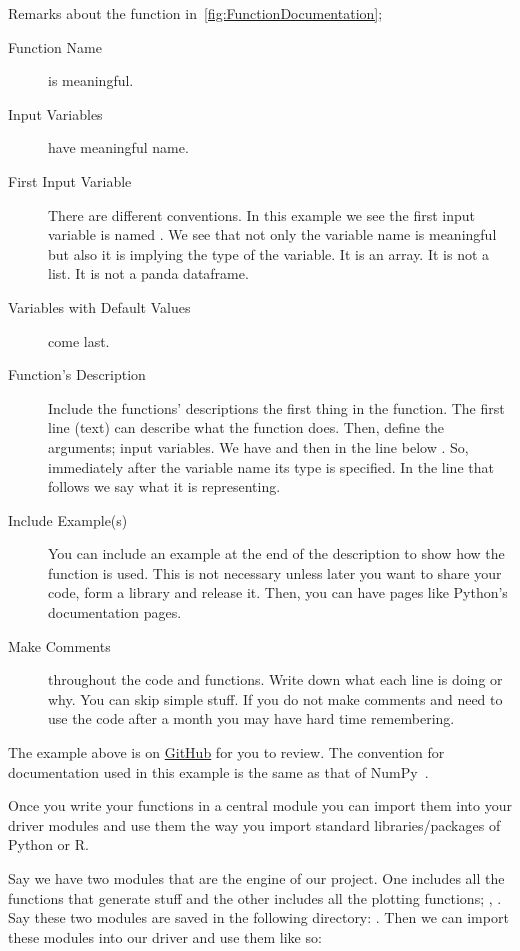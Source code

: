 \noindent Remarks about the function in~\cref{fig:FunctionDocumentation};
\begin{description}
\item [Function Name] is meaningful.
\item [Input Variables] have meaningful name. 
\item [First Input Variable] There are different conventions. In this
example we see the first input variable is named .
We see that not only the variable name is meaningful but also
it is implying the type of the variable. It is an array. It is not a list.
It is not a panda dataframe. 

\item [Variables with Default Values] come last.

\item [Function's Description] Include the functions' descriptions
the first thing in the function. The first line (text) can describe what the function does. 
Then, define the arguments; input variables. 
We have  and then in the line below .
So, immediately after the variable name its type is specified. In the line that follows we
say what it is representing.

\item [Include Example(s)] You can include an example at the end of the
description to show how the function is used. This is not necessary unless
later you want to share your code, form a library and release it.
Then, you can have pages
like Python's documentation pages.

\item [Make Comments] throughout the code and functions.
Write down what each line is doing or why. You can skip
simple stuff. If you do not make comments and need to use
the code after a month you may have hard time remembering.
\end{description}
The example above is on \href{https://github.com/HNoorazar/Ag/blob/master/Kirtis\_Class/Python/Kirtis\_Class\_core.py}{GitHub} for you to review.
The convention for documentation used in this example is the same as 
that of NumPy~\citep{numpyStyle}.

Once you write your functions in a central module
you can import them into your driver modules and use
them the way you import standard libraries/packages of Python or R.

Say we have two modules that are the engine of our project.
One includes all the functions that generate stuff and the other
includes all the plotting functions; ,
.
Say these two modules are saved in 
the following directory:
.
Then we can import these modules into our driver
and use them like so:

